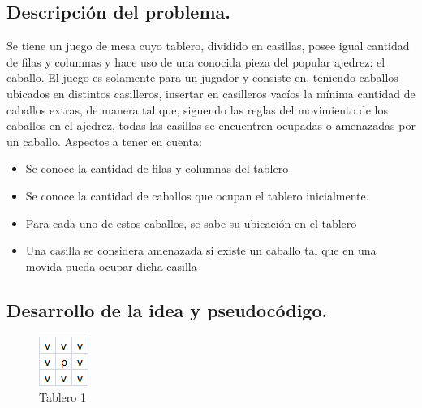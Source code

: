 \subsection{Descripción del problema.}

\vspace*{0.3cm}

Se tiene un juego de mesa cuyo tablero, dividido en casillas, posee igual cantidad de filas y columnas y hace uso de una conocida pieza del popular ajedrez: el caballo. El juego es solamente para un jugador y consiste en, teniendo caballos ubicados en distintos casilleros, insertar en casilleros vacíos la mínima cantidad de caballos extras, de manera tal que, siguendo las reglas del movimiento de los caballos en el ajedrez, todas las casillas se encuentren ocupadas o amenazadas por un caballo.
Aspectos a tener en cuenta:

\begin{itemize}
   \item Se conoce la cantidad de filas y columnas del tablero
   \item Se conoce la cantidad de caballos que ocupan el tablero inicialmente.
   \item Para cada uno de estos caballos, se sabe su ubicación en el tablero
   \item Una casilla se considera amenazada si existe un caballo tal que en una movida pueda ocupar dicha casilla
\end{itemize}


\vspace*{0.6cm}

\subsection{Desarrollo de la idea y pseudocódigo.}

\begin{figure}[htb]
  \begin{center}
      \includegraphics[scale=1]{imagenes/tab1.png}
  \end{center}
  \caption{Tablero 1}\label{fig:tab1}
\end{figure}
\vspace*{0.3cm}

